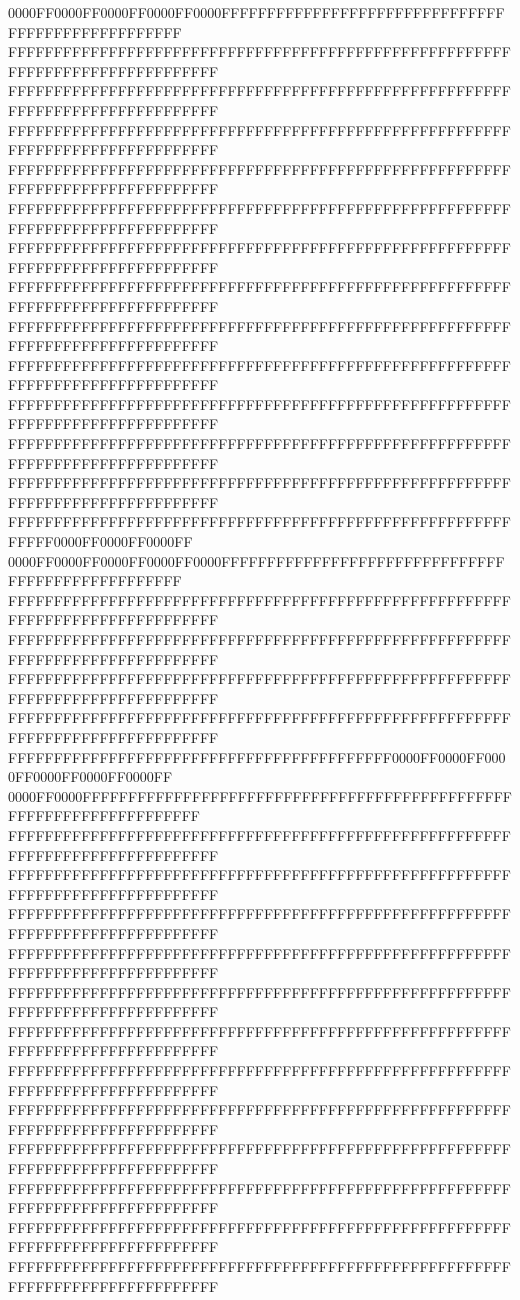 0000FF0000FF0000FF0000FF0000FFFFFFFFFFFFFFFFFFFFFFFFFFFFFFFFFFFFFFFFFFFFFFFFFF
FFFFFFFFFFFFFFFFFFFFFFFFFFFFFFFFFFFFFFFFFFFFFFFFFFFFFFFFFFFFFFFFFFFFFFFFFFFFFF
FFFFFFFFFFFFFFFFFFFFFFFFFFFFFFFFFFFFFFFFFFFFFFFFFFFFFFFFFFFFFFFFFFFFFFFFFFFFFF
FFFFFFFFFFFFFFFFFFFFFFFFFFFFFFFFFFFFFFFFFFFFFFFFFFFFFFFFFFFFFFFFFFFFFFFFFFFFFF
FFFFFFFFFFFFFFFFFFFFFFFFFFFFFFFFFFFFFFFFFFFFFFFFFFFFFFFFFFFFFFFFFFFFFFFFFFFFFF
FFFFFFFFFFFFFFFFFFFFFFFFFFFFFFFFFFFFFFFFFFFFFFFFFFFFFFFFFFFFFFFFFFFFFFFFFFFFFF
FFFFFFFFFFFFFFFFFFFFFFFFFFFFFFFFFFFFFFFFFFFFFFFFFFFFFFFFFFFFFFFFFFFFFFFFFFFFFF
FFFFFFFFFFFFFFFFFFFFFFFFFFFFFFFFFFFFFFFFFFFFFFFFFFFFFFFFFFFFFFFFFFFFFFFFFFFFFF
FFFFFFFFFFFFFFFFFFFFFFFFFFFFFFFFFFFFFFFFFFFFFFFFFFFFFFFFFFFFFFFFFFFFFFFFFFFFFF
FFFFFFFFFFFFFFFFFFFFFFFFFFFFFFFFFFFFFFFFFFFFFFFFFFFFFFFFFFFFFFFFFFFFFFFFFFFFFF
FFFFFFFFFFFFFFFFFFFFFFFFFFFFFFFFFFFFFFFFFFFFFFFFFFFFFFFFFFFFFFFFFFFFFFFFFFFFFF
FFFFFFFFFFFFFFFFFFFFFFFFFFFFFFFFFFFFFFFFFFFFFFFFFFFFFFFFFFFFFFFFFFFFFFFFFFFFFF
FFFFFFFFFFFFFFFFFFFFFFFFFFFFFFFFFFFFFFFFFFFFFFFFFFFFFFFFFFFFFFFFFFFFFFFFFFFFFF
FFFFFFFFFFFFFFFFFFFFFFFFFFFFFFFFFFFFFFFFFFFFFFFFFFFFFFFFFFFF0000FF0000FF0000FF
0000FF0000FF0000FF0000FF0000FFFFFFFFFFFFFFFFFFFFFFFFFFFFFFFFFFFFFFFFFFFFFFFFFF
FFFFFFFFFFFFFFFFFFFFFFFFFFFFFFFFFFFFFFFFFFFFFFFFFFFFFFFFFFFFFFFFFFFFFFFFFFFFFF
FFFFFFFFFFFFFFFFFFFFFFFFFFFFFFFFFFFFFFFFFFFFFFFFFFFFFFFFFFFFFFFFFFFFFFFFFFFFFF
FFFFFFFFFFFFFFFFFFFFFFFFFFFFFFFFFFFFFFFFFFFFFFFFFFFFFFFFFFFFFFFFFFFFFFFFFFFFFF
FFFFFFFFFFFFFFFFFFFFFFFFFFFFFFFFFFFFFFFFFFFFFFFFFFFFFFFFFFFFFFFFFFFFFFFFFFFFFF
FFFFFFFFFFFFFFFFFFFFFFFFFFFFFFFFFFFFFFFFFF0000FF0000FF0000FF0000FF0000FF0000FF
0000FF0000FFFFFFFFFFFFFFFFFFFFFFFFFFFFFFFFFFFFFFFFFFFFFFFFFFFFFFFFFFFFFFFFFFFF
FFFFFFFFFFFFFFFFFFFFFFFFFFFFFFFFFFFFFFFFFFFFFFFFFFFFFFFFFFFFFFFFFFFFFFFFFFFFFF
FFFFFFFFFFFFFFFFFFFFFFFFFFFFFFFFFFFFFFFFFFFFFFFFFFFFFFFFFFFFFFFFFFFFFFFFFFFFFF
FFFFFFFFFFFFFFFFFFFFFFFFFFFFFFFFFFFFFFFFFFFFFFFFFFFFFFFFFFFFFFFFFFFFFFFFFFFFFF
FFFFFFFFFFFFFFFFFFFFFFFFFFFFFFFFFFFFFFFFFFFFFFFFFFFFFFFFFFFFFFFFFFFFFFFFFFFFFF
FFFFFFFFFFFFFFFFFFFFFFFFFFFFFFFFFFFFFFFFFFFFFFFFFFFFFFFFFFFFFFFFFFFFFFFFFFFFFF
FFFFFFFFFFFFFFFFFFFFFFFFFFFFFFFFFFFFFFFFFFFFFFFFFFFFFFFFFFFFFFFFFFFFFFFFFFFFFF
FFFFFFFFFFFFFFFFFFFFFFFFFFFFFFFFFFFFFFFFFFFFFFFFFFFFFFFFFFFFFFFFFFFFFFFFFFFFFF
FFFFFFFFFFFFFFFFFFFFFFFFFFFFFFFFFFFFFFFFFFFFFFFFFFFFFFFFFFFFFFFFFFFFFFFFFFFFFF
FFFFFFFFFFFFFFFFFFFFFFFFFFFFFFFFFFFFFFFFFFFFFFFFFFFFFFFFFFFFFFFFFFFFFFFFFFFFFF
FFFFFFFFFFFFFFFFFFFFFFFFFFFFFFFFFFFFFFFFFFFFFFFFFFFFFFFFFFFFFFFFFFFFFFFFFFFFFF
FFFFFFFFFFFFFFFFFFFFFFFFFFFFFFFFFFFFFFFFFFFFFFFFFFFFFFFFFFFFFFFFFFFFFFFFFFFFFF
FFFFFFFFFFFFFFFFFFFFFFFFFFFFFFFFFFFFFFFFFFFFFFFFFFFFFFFFFFFFFFFFFFFFFFFFFFFFFF
